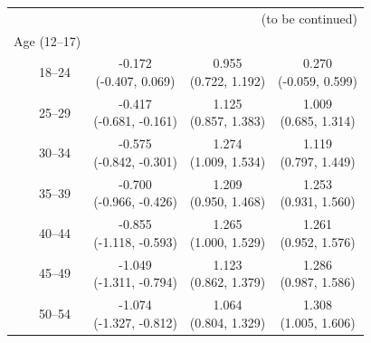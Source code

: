 \documentclass[12pt]{article}
\begin{document}
\begin{appendices}
\begin{longtable}{lccc}
    \hline \multicolumn{4}{r}{{(to be continued)}} \\
    \endfoot
    
    \endlastfoot
    
    Age (12--17) & & & \\  
    ~~~~18--24 & \makecell{ -0.172 \\ [-1ex] (-0.407, 0.069) } 
               & \makecell{ 0.955 \\ [-1ex] (0.722, 1.192) }
               & \makecell{ 0.270 \\ [-1ex] (-0.059, 0.599) } \\ 
    ~~~~25--29 & \makecell{ -0.417 \\ [-1ex] (-0.681, -0.161) }
               & \makecell{ 1.125 \\ [-1ex] (0.857, 1.383) }
               & \makecell{ 1.009 \\ [-1ex] (0.685, 1.314) } \\ 
    ~~~~30--34 & \makecell{ -0.575 \\ [-1ex] (-0.842, -0.301) }
               & \makecell{ 1.274 \\ [-1ex] (1.009, 1.534) }
               & \makecell{ 1.119 \\ [-1ex] (0.797, 1.449) } \\ 
    ~~~~35--39 & \makecell{ -0.700 \\ [-1ex] (-0.966, -0.426) }
               & \makecell{ 1.209 \\ [-1ex] (0.950, 1.468) }
               & \makecell{ 1.253 \\ [-1ex] (0.931, 1.560) } \\ 
    ~~~~40--44 & \makecell{ -0.855 \\ [-1ex] (-1.118, -0.593) }
               & \makecell{ 1.265 \\ [-1ex] (1.000, 1.529) }
               & \makecell{ 1.261 \\ [-1ex] (0.952, 1.576) } \\ 
    ~~~~45--49 & \makecell{ -1.049 \\ [-1ex] (-1.311, -0.794) }
               & \makecell{ 1.123 \\ [-1ex] (0.862, 1.379) }
               & \makecell{ 1.286 \\ [-1ex] (0.987, 1.586) } \\ 
    ~~~~50--54 & \makecell{ -1.074 \\ [-1ex] (-1.327, -0.812) }
               & \makecell{ 1.064 \\ [-1ex] (0.804, 1.329) }
               & \makecell{ 1.308 \\ [-1ex] (1.005, 1.606) } \\ 

\end{longtable}
\end{appendices}
\end{document}
